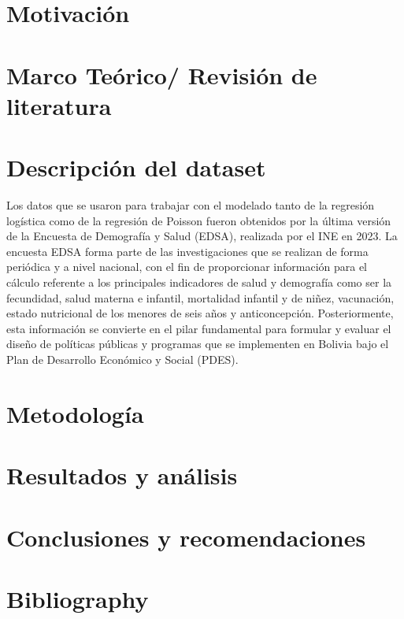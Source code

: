 \documentclass[Royal,times,sageh]{sagej}
\begin{document}
\section{Motivación}\label{motivaciuxf3n}

\section{Marco Teórico/ Revisión de
literatura}\label{marco-teuxf3rico-revisiuxf3n-de-literatura}

\section{Descripción del dataset}\label{descripciuxf3n-del-dataset}

Los datos que se usaron para trabajar con el modelado tanto de la
regresión logística como de la regresión de Poisson fueron obtenidos por
la última versión de la Encuesta de Demografía y Salud (EDSA), realizada
por el INE en 2023. La encuesta EDSA forma parte de las investigaciones
que se realizan de forma periódica y a nivel nacional, con el fin de
proporcionar información para el cálculo referente a los principales
indicadores de salud y demografía como ser la fecundidad, salud materna
e infantil, mortalidad infantil y de niñez, vacunación, estado
nutricional de los menores de seis años y anticoncepción.
Posteriormente, esta información se convierte en el pilar fundamental
para formular y evaluar el diseño de políticas públicas y programas que
se implementen en Bolivia bajo el Plan de Desarrollo Económico y Social
(PDES).

\section{Metodología}\label{metodologuxeda}

\section{Resultados y análisis}\label{resultados-y-anuxe1lisis}

\section{Conclusiones y
recomendaciones}\label{conclusiones-y-recomendaciones}

\section{Bibliography}\label{bibliography}
\end{document}
